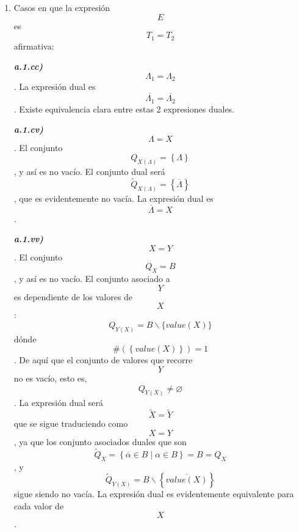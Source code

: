 \begin{enumerate}
\begin{enumerate}
\begin{enumerate}
\begin{enumerate}
\begin{enumerate}
          en \textbf{B}, que será el conjunto de los elementos de
          \textbf{B} que son inversos de los elementos de \textbf{Q}, ya
          que para cada constante o valor que tome una variable, el dual
          será el dual de esa constante o valor, esto es, el complemento
          de esa constante o valor. Para una variable \textbf{a}, el
          conjunto de valores que recorre es
          \textbf{Q}\textsubscript{\textbf{a}} . Si necesi\-tamos algún
          conjunto auxiliar lo llamaremos \textbf{A} y se de\-finirá
          antes de su uso con la idea que no sea demasiado engorrosa la
          escritura. Si un conjunto \textbf{C} es sin el 1 lo
          denotaremos por \textbf{C}\textsubscript{\textbf{*}} y si es
          sin el 0 lo denotaremos \textbf{C}\textsuperscript{\textbf{*}}
          y definimos
          \textbf{B}\textsubscript{\textbf{2}}\textbf{=\{0,1\}} y si un
          conjunto \textbf{C} es sin 0 y sin 1 lo denotamos por
          \textbf{C}\textsuperscript{\textbf{X}}. Otro elemento
          importante son los paréntesis, que permiten una no
          asociatividad generali\-zada entre las diversas operaciones,
          al no cambiar en absoluto en la expresión dual.
        \item
          Casos en que la expresión \[E\] es\[T_{1} = T_{2}\]afirmativa:

          \emph{\textbf{a.1.cc)}} \[\Lambda_{1} = \Lambda_{2}\]. La
          expresión dual es
          \[\overline{\Lambda_{1}} = \overline{\Lambda_{2}}\]. Existe
          equivalencia cla\-ra entre estas 2 expresiones duales.

          \emph{\textbf{a.1.cv)}} \[\Lambda = X\]. El conjunto
          \[Q_{X{(\Lambda)}} = \left\{ \Lambda \right\}\] , y así es no
          vacío. El conjunto dual será
          \[{\widetilde{Q}}_{X{(\Lambda)}} = \left\{ \overline{\Lambda} \right\}\],
          que es evidentemente no vacía. La expresión dual es
          \[\overline{\Lambda} = X\].

          \emph{\textbf{a.1.vv)}} \[X = Y\]. El conjunto \[Q_{X} = B\] ,
          y así es no vacío. El conjunto asociado a \[Y\] es dependiente
          de los valores de \[X\]:
          \[Q_{Y{(X)}} = {B \smallsetminus {\{{\mathit{value}{(X)}}\}}}\]dónde
          \[\#{\left( \left\{ {\mathit{value}{(X)}} \right\} \right) = 1}\].
          De aquí que el con\-junto de valores que recorre \[Y\]no es
          vacío, esto es, \[Q_{Y{(X)}} \neq \varnothing\]. La
          ex\-presión dual será \[\widetilde{X} = \widetilde{Y}\] que se
          sigue traduciendo como \[X = Y\], ya que los conjunto
          asociados duales que son
          \[{{{\widetilde{Q}}_{X} = \left\{ {{\overline{\alpha} \in B} \mid {\alpha \in B}} \right\}} = B} = Q_{X}\],
          y
          \[{\widetilde{Q}}_{Y{(X)}} = {B \smallsetminus \left\{ \overline{\mathit{value}{(X)}} \right\}}\]sigue
          siendo no vacía. La expresión dual es evi\-dentemente
          equivalente para cada valor de \[X\].


\end{enumerate}
\end{enumerate}
\end{enumerate}
\end{enumerate}
\end{enumerate}
